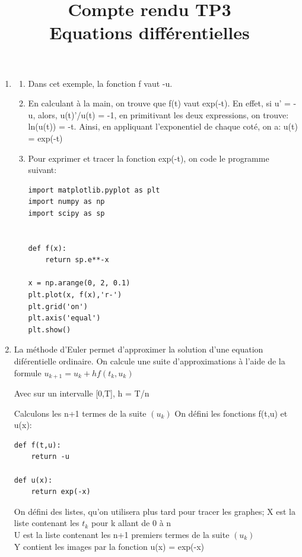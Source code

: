 \documentclass{article}
\title{Compte rendu TP3\\ Equations différentielles}
\begin{document}
\maketitle



\begin{enumerate}
\item
	\begin{enumerate}
	\item
  Dans cet exemple, la fonction f vaut -u.

	\item
  En calculant à la main, on trouve que f(t) vaut exp(-t).
En effet, si u' = -u, alors, u(t)'/u(t) = -1, en primitivant les deux expressions, on trouve: ln(u(t)) = -t. Ainsi, en appliquant l'exponentiel de chaque coté, on a: u(t) = exp(-t)

	\item
  Pour exprimer et tracer la fonction exp(-t), on code le programme suivant:

\begin{lstlisting}[basicstyle=\small]
import matplotlib.pyplot as plt
import numpy as np
import scipy as sp


def f(x):
    return sp.e**-x

x = np.arange(0, 2, 0.1)
plt.plot(x, f(x),'r-')
plt.grid('on')
plt.axis('equal')
plt.show()

\end{lstlisting}

	\end{enumerate}

\item La méthode d'Euler permet d'approximer la solution d'une equation diférentielle ordinaire. 
On calcule une suite d'approximations à l'aide de la formule 
$u_{k+1} = u_k + hf(t_k, u_k)$

Avec sur un intervalle [0,T], h = T/n
\begin{enumerate}
Calculons les n+1 termes de la suite  $(u_k)$
On défini les fonctions f(t,u) et u(x):

\begin{lstlisting}[basicstyle=\small]
def f(t,u):
	return -u

def u(x):
	return exp(-x)
\end{lstlisting}
On défini des listes, qu'on utilisera plus tard pour tracer les graphes;
X est la liste contenant les $t_k$ pour k allant de 0 à n \\
U est la liste contenant les n+1 premiers termes de la suite $(u_k)$ \\
Y contient les images par la fonction u(x) = exp(-x) \\


\end{enumerate}
\end{enumerate}
\end{document}
